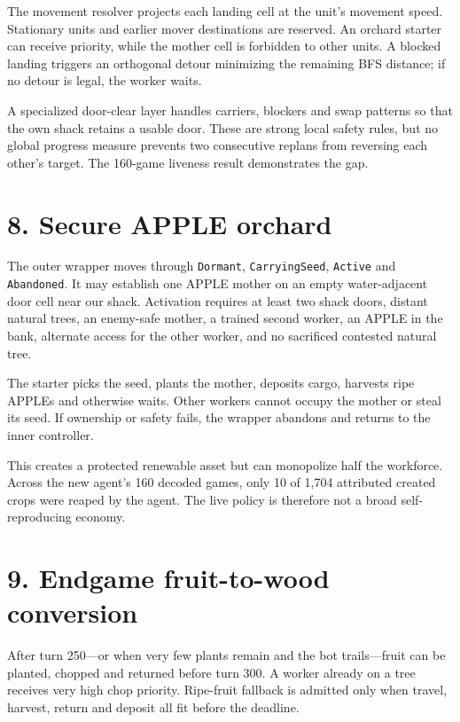 \documentclass[10pt,a4paper]{article}
\begin{document}
The movement resolver projects each landing cell at the unit's movement speed. Stationary
units and earlier mover destinations are reserved. An orchard starter can receive priority,
while the mother cell is forbidden to other units. A blocked landing triggers an orthogonal
detour minimizing the remaining BFS distance; if no detour is legal, the worker waits.

A specialized door-clear layer handles carriers, blockers and swap patterns so that the
own shack retains a usable door. These are strong local safety rules, but no global progress
measure prevents two consecutive replans from reversing each other's target. The 160-game
liveness result demonstrates the gap.

\section*{8. Secure APPLE orchard}

The outer wrapper moves through \texttt{Dormant}, \texttt{CarryingSeed}, \texttt{Active}
and \texttt{Abandoned}. It may establish one APPLE mother on an empty water-adjacent door
cell near our shack. Activation requires at least two shack doors, distant natural trees,
an enemy-safe mother, a trained second worker, an APPLE in the bank, alternate access for
the other worker, and no sacrificed contested natural tree.

The starter picks the seed, plants the mother, deposits cargo, harvests ripe APPLEs and
otherwise waits. Other workers cannot occupy the mother or steal its seed. If ownership or
safety fails, the wrapper abandons and returns to the inner controller.

This creates a protected renewable asset but can monopolize half the workforce. Across the
new agent's 160 decoded games, only 10 of 1,704 attributed created crops were reaped by the
agent. The live policy is therefore not a broad self-reproducing economy.

\section*{9. Endgame fruit-to-wood conversion}

After turn 250---or when very few plants remain and the bot trails---fruit can be planted,
chopped and returned before turn 300. A worker already on a tree receives very high chop
priority. Ripe-fruit fallback is admitted only when travel, harvest, return and deposit all
fit before the deadline.
\end{document}
